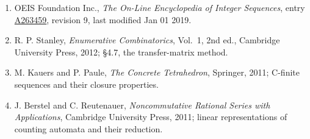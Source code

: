 \documentclass[11pt]{article}
\theoremstyle{definition}
\begin{document}
\begin{enumerate}

\item OEIS Foundation Inc., \emph{The On-Line Encyclopedia of Integer Sequences}, entry \href{https://oeis.org/A263459}{A263459}, revision 9, last modified Jan 01 2019.

\item R. P. Stanley, \emph{Enumerative Combinatorics}, Vol.~1, 2nd ed., Cambridge University Press, 2012; \S4.7, the transfer-matrix method.

\item M. Kauers and P. Paule, \emph{The Concrete Tetrahedron}, Springer, 2011; C-finite sequences and their closure properties.

\item J. Berstel and C. Reutenauer, \emph{Noncommutative Rational Series with Applications}, Cambridge University Press, 2011; linear representations of counting automata and their reduction.

\end{enumerate}
\end{document}
